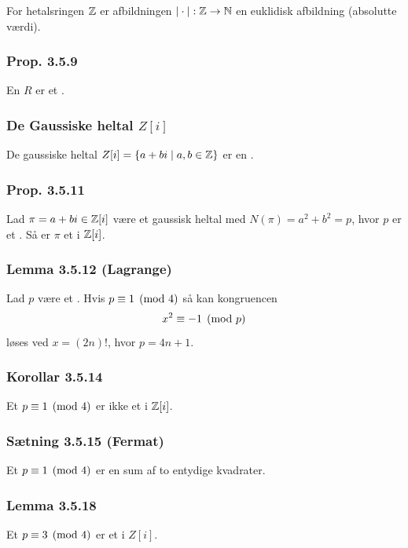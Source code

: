 For hetalsringen $\mathbb{Z}$ er afbildningen $|\cdot|: \mathbb{Z} \rightarrow \mathbb{N}$ en euklidisk
afbildning (absolutte værdi).

\subsubsection{Prop. 3.5.9}
\label{Prop. 3.5.9}
En  $R$ er et .

\subsubsection{De Gaussiske heltal $Z[i]$}
\label{De gaussiske heltal $Z[i]$}
De gaussiske heltal $Z[i] = \{ a + bi \mid a,b \in \mathbb{Z} \}$ er en
.

\subsubsection{Prop. 3.5.11}
\label{Prop. 3.5.11}
Lad $\pi = a + bi \in \mathbb{Z}[i]$ være et gaussisk heltal med $N(\pi) = a^2 + b^2 =
p$, hvor $p$ er et . Så er $\pi$ et  i
$\mathbb{Z}[i]$.

\subsubsection{Lemma 3.5.12 (Lagrange)}
\label{Lemma 3.5.12}
Lad $p$ være et . Hvis $p \equiv 1 \pmod{4}$ så kan kongruencen
\begin{equation*}
  x^2 \equiv -1 \pmod{p}
\end{equation*}
løses ved $x = (2n)!$, hvor $p = 4n +1$.

\subsubsection{Korollar 3.5.14}
\label{Korollar 3.5.14}
Et  $p \equiv 1 \pmod{4}$ er ikke et  i
$\mathbb{Z}[i]$.

\subsubsection{Sætning 3.5.15 (Fermat)}
\label{Saetning 3.5.15 (Fermat)}
Et  $p \equiv 1 \pmod{4}$ er en sum af to entydige kvadrater.

\subsubsection{Lemma 3.5.18}
\label{Lemma 3.5.18}
Et  $p \equiv 3 \pmod{4}$ er et  i $Z[i]$.

